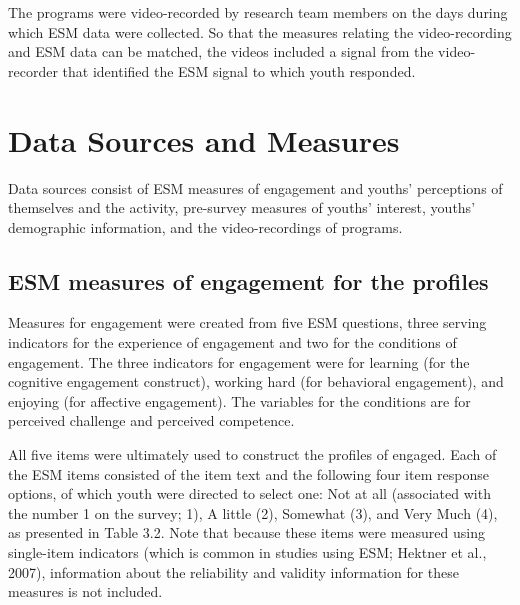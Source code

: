 \documentclass[]{msu-thesis}
\theoremstyle{definition}
\theoremstyle{definition}
\theoremstyle{definition}
\theoremstyle{remark}
\begin{document}
The programs were video-recorded by research team members on the days
during which ESM data were collected. So that the measures relating the
video-recording and ESM data can be matched, the videos included a
signal from the video-recorder that identified the ESM signal to which
youth responded.

\section{Data Sources and Measures}\label{data-sources-and-measures}

Data sources consist of ESM measures of engagement and youths'
perceptions of themselves and the activity, pre-survey measures of
youths' interest, youths' demographic information, and the
video-recordings of programs.

\subsection{ESM measures of engagement for the
profiles}\label{esm-measures-of-engagement-for-the-profiles}

Measures for engagement were created from five ESM questions, three
serving indicators for the experience of engagement and two for the
conditions of engagement. The three indicators for engagement were for
learning (for the cognitive engagement construct), working hard (for
behavioral engagement), and enjoying (for affective engagement). The
variables for the conditions are for perceived challenge and perceived
competence.

All five items were ultimately used to construct the profiles of
engaged. Each of the ESM items consisted of the item text and the
following four item response options, of which youth were directed to
select one: Not at all (associated with the number 1 on the survey; 1),
A little (2), Somewhat (3), and Very Much (4), as presented in Table
3.2. Note that because these items were measured using single-item
indicators (which is common in studies using ESM; Hektner et al., 2007),
information about the reliability and validity information for these
measures is not included.

\begin{table}

\caption{\label{tab:unnamed-chunk-3}ESM measures for profiles}
\centering
{}
\end{table}
\end{document}
